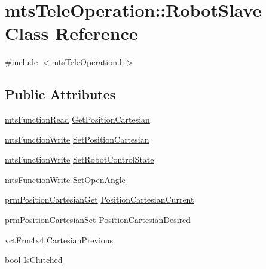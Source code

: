 \hypertarget{classmts_tele_operation_1_1_robot_slave}{}\section{mts\+Tele\+Operation\+:\+:Robot\+Slave Class Reference}
\label{classmts_tele_operation_1_1_robot_slave}


{\ttfamily \#include $<$mts\+Tele\+Operation.\+h$>$}

\subsection*{Public Attributes}
\begin{DoxyCompactItemize}
\item 
\hyperlink{classmts_function_read}{mts\+Function\+Read} \hyperlink{classmts_tele_operation_1_1_robot_slave_a4e162dfa31d136f8f7f44fed8a069e6b}{Get\+Position\+Cartesian}
\item 
\hyperlink{classmts_function_write}{mts\+Function\+Write} \hyperlink{classmts_tele_operation_1_1_robot_slave_a1459465173fd01f73a99062b2fbba3f0}{Set\+Position\+Cartesian}
\item 
\hyperlink{classmts_function_write}{mts\+Function\+Write} \hyperlink{classmts_tele_operation_1_1_robot_slave_a7d66a6da265a36a7f88492030adb29af}{Set\+Robot\+Control\+State}
\item 
\hyperlink{classmts_function_write}{mts\+Function\+Write} \hyperlink{classmts_tele_operation_1_1_robot_slave_afeff3929a101951648742bcf9c7b9c1d}{Set\+Open\+Angle}
\item 
\hyperlink{classprm_position_cartesian_get}{prm\+Position\+Cartesian\+Get} \hyperlink{classmts_tele_operation_1_1_robot_slave_a73c0eae30312661f3992f9d1b3a31c5a}{Position\+Cartesian\+Current}
\item 
\hyperlink{classprm_position_cartesian_set}{prm\+Position\+Cartesian\+Set} \hyperlink{classmts_tele_operation_1_1_robot_slave_ab79377bd91a457f5e32b86be683d2155}{Position\+Cartesian\+Desired}
\item 
\hyperlink{vct_transformation_types_8h_a33da47f4deb2556b37a69a2c44b29d75}{vct\+Frm4x4} \hyperlink{classmts_tele_operation_1_1_robot_slave_a677cbc91dd8a2e32697c3345f0ef91fb}{Cartesian\+Previous}
\item 
bool \hyperlink{classmts_tele_operation_1_1_robot_slave_ad99b773634528c1eeafb37e730c6f76f}{Is\+Clutched}
\end{DoxyCompactItemize}


